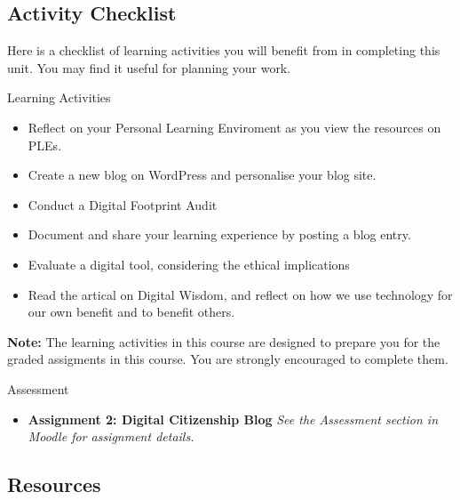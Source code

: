 \documentclass[
]{book}
\providecommand{\tightlist}{%
  \setlength{\itemsep}{0pt}\setlength{\parskip}{0pt}}
\theoremstyle{definition}
\theoremstyle{definition}
\theoremstyle{definition}
\theoremstyle{definition}
\theoremstyle{remark}
\begin{document}
\hypertarget{activity-checklist-3}{%
\subsection*{Activity Checklist}\label{activity-checklist-3}}

Here is a checklist of learning activities you will benefit from in completing this unit. You may find it useful for planning your work.

\begin{reflect}
{Learning Activities}

\begin{itemize}
\tightlist
\item
  Reflect on your Personal Learning Enviroment as you view the resources on PLEs.\\
\item
  Create a new blog on WordPress and personalise your blog site.\\
\item
  Conduct a Digital Footprint Audit\\
\item
  Document and share your learning experience by posting a blog entry.\\
\item
  Evaluate a digital tool, considering the ethical implications\\
\item
  Read the artical on Digital Wisdom, and reflect on how we use technology for our own benefit and to benefit others.
\end{itemize}

\textbf{Note:} The learning activities in this course are designed to prepare you for the graded assigments in this course. You are strongly encouraged to complete them.
\end{reflect}

\begin{assessment}
{Assessment}

\begin{itemize}
\tightlist
\item
  \textbf{Assignment 2: Digital Citizenship Blog}
  \emph{See the Assessment section in Moodle for assignment details.}
\end{itemize}
\end{assessment}

\hypertarget{resources-3}{%
\subsection*{Resources}\label{resources-3}}
\end{document}
